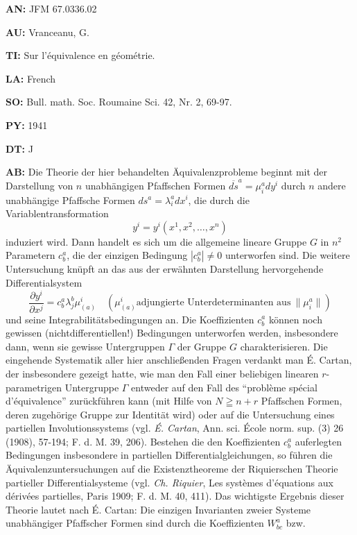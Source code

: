 \item{\bf AN:} JFM 67.0336.02
\item{\bf AU:} Vranceanu, G.
\item{\bf TI:} Sur l'\'equivalence en g\'eom\'etrie.
\item{\bf LA:} French
\item{\bf SO:} Bull. math. Soc. Roumaine Sci. 42, Nr. 2, 69-97.
\item{\bf PY:} 1941
\item{\bf DT:} J
\item{\bf AB:}{\parindent15pt
 Die Theorie der hier behandelten \"Aquivalenzprobleme beginnt mit der
Darstellung von $n$ unabh\"angigen Pfaffschen Formen
$\overline{ds}^a=\mu^a_idy^i$
durch $n$ andere
unabh\"angige Pfaffsche
Formen $ds^a = \lambda_i^adx^i$, die durch die Variablentransformation
$$
 y^i = y^i(x^1,x^2,\ldots, x^n)
 $$
induziert wird. Dann handelt es sich um die allgemeine lineare Gruppe $G$ in
$n^2$
Parametern $c_b^a$, die der
einzigen Bedingung $|c_b^a|\ne 0$ unterworfen sind. Die weitere
Untersuchung kn\"upft an das aus der erw\"ahnten Darstellung hervorgehende
Differentialsystem
$$
\dfrac{\partial y^i}{\partial x^j}=c_b^a\lambda_j^b\mu^i_{(a)}\quad (\mu^i_{(a)}
\text{adjungierte Unterdeterminanten aus} \ \|\mu_i^a\|)
$$
und seine Integrabilit\"atsbedingungen an. Die Koeffizienten $c_b^a$
k\"onnen noch
gewissen
(nichtdifferentiellen!) Bedingungen unterworfen werden, insbesondere dann, wenn
sie gewisse Untergruppen $\varGamma$ der Gruppe $G$
charakterisieren. Die eingehende
Systematik aller hier
anschlie{\ss}enden Fragen verdankt man \'E. Cartan, der insbesondere
gezeigt hatte, wie man
den Fall einer beliebigen linearen $r$-parametrigen Untergruppe
$\varGamma$ entweder auf den Fall
des ``probl\`eme sp\'ecial d'\'equivalence'' zur\"uckf\"uhren
kann
(mit Hilfe von $N \geqq n+r$
Pfaffschen Formen, deren zugeh\"orige Gruppe zur Identit\"at
wird) oder auf die Untersuchung
eines partiellen Involutionssystems (vgl. {\it \'E. Cartan},
Ann. sci. \'Ecole norm.
sup. (3) 26 (1908), 57-194; F. d. M. 39, 206). Bestehen die
den Koeffizienten $c_b^a$ auferlegten Bedingungen insbesondere in partiellen
Differentialgleichungen,
so f\"uhren die \"Aquivalenzuntersuchungen auf die Existenztheoreme
der
Riquierschen Theorie
partieller Differentialsysteme (vgl. {\it Ch. Riquier}, Les syst\`emes
d'\'equations aux d\'eriv\'ees
partielles, Paris 1909; F. d. M. 40, 411). Das wichtigste
Ergebnis dieser Theorie lautet nach \'E. Cartan: Die einzigen Invarianten zweier
Systeme unabh\"angiger Pfaffscher Formen sind durch die Koeffizienten $W_{bc}^a$ bzw.
}
